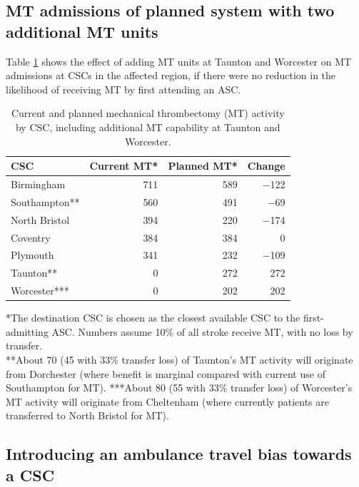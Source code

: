 \subsection{MT admissions of planned system with two additional MT units}

Table \ref{tab:mt_units} shows the effect of adding MT units at Taunton and Worcester on MT admissions at CSCs in the affected region, if there were no reduction in the likelihood of receiving MT by first attending an ASC.

\begin{table}[htbp]
\centering
\caption{Current and planned mechanical thrombectomy (MT) activity by CSC, including additional MT capability at Taunton and Worcester.}
\label{tab:mt_units}
\begin{tabular}{l|r|r|r}
\hline
\textbf{CSC} & \textbf{Current MT*} & \textbf{Planned MT*} & \textbf{Change} \\
\hline
Birmingham & 711 & 589 & $-$122 \\
Southampton** & 560 & 491 & $-$69 \\
North Bristol & 394 & 220 & $-$174 \\
Coventry & 384 & 384 & 0 \\
Plymouth & 341 & 232 & $-$109 \\
Taunton** & 0 & 272 & 272 \\
Worcester*** & 0 & 202 & 202 \\
\hline
\end{tabular}

\vspace{1.0em}
\begin{minipage}{0.85\linewidth}
\small
*The destination CSC is chosen as the closest available CSC to the first-admitting ASC. Numbers assume 10\% of all stroke receive MT, with no loss by transfer.\\
**About 70 (45 with 33\% transfer loss) of Taunton’s MT activity will originate from Dorchester (where benefit is marginal compared with current use of Southampton for MT).
***About 80 (55 with 33\% transfer loss) of Worcester’s MT activity will originate from Cheltenham (where currently patients are transferred to North Bristol for MT).
\end{minipage}
\end{table}

\subsection{Introducing an ambulance travel bias towards a CSC}

